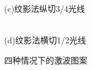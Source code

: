 \documentclass[12pt,a4paper,boxed,titlepage]{caspset}
\begin{document}
\begin{figure}[!htb]
\begin{minipage}[b]{.5\textwidth}
(c)纹影法纵切3/4光线
\end{minipage}%
\begin{minipage}[b]{.5\textwidth}
\centering
{}\\
(d)纹影法横切1/2光线
\end{minipage}
\caption{\label{wave}四种情况下的激波图案}
\end{figure}
\end{document}
